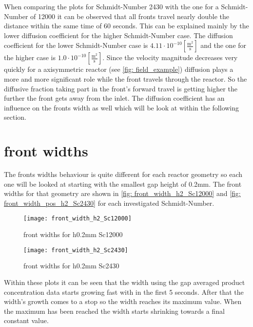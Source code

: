 \documentclass[../thesis.tex]{subfiles}
\begin{document}
When comparing the plots for Schmidt-Number 2430 with the one for a Schmidt-Number of 12000 it can be observed that all fronts travel nearly double the distance within the same time of 60 seconds. This can be explained mainly by the lower diffusion coefficient for the higher Schmidt-Number case. The diffusion coefficient for the lower Schmidt-Number case is $4 \text{.}11 \cdot 10^{-10} \left[ \frac{\mathrm{m^2}}{\mathrm{s}} \right]$ and the one for the higher case is $1\text{.}0 \cdot 10^{-10} \left[ \frac{\mathrm{m^2}}{\mathrm{s}} \right]$.
Since the velocity magnitude decreases very quickly for a axisymmetric reactor (see \autoref{fig: field_example}) diffusion plays a more and more significant role while the front travels through the reactor. So the diffusive fraction taking part in the front's forward travel is getting higher the further the front gets away from the inlet. The diffusion coefficient has an influence on the fronts width as well which will be look at within the following section.

\section{front widths}

The fronts widths behaviour is quite different for each reactor geometry so each one will be looked at starting with the smallest gap height of 0.2mm. The front widths for that geometry are shown in \autoref{fig: front_width_h2_Sc12000} and \autoref{fig: front_width_pos_h2_Sc2430} for each investigated Schmidt-Number.

\begin{figure}[htbp]
	\centering
	\texttt{[image: front\_width\_h2\_Sc12000]}
	\caption{front widths for h0.2mm Sc12000\label{fig: front_width_h2_Sc12000}}\bigskip
	\texttt{[image: front\_width\_h2\_Sc2430]}
	\caption{front widths for h0.2mm Sc2430\label{fig: front_width_pos_h2_Sc2430}}
\end{figure}

Within these plots it can be seen that the width using the gap averaged product concentration data starts growing fast with in the first 5 seconds. After that the width's growth comes to a stop so the width reaches its maximum value. When the maximum has been reached the width starts shrinking towards a final constant value.
\end{document}
